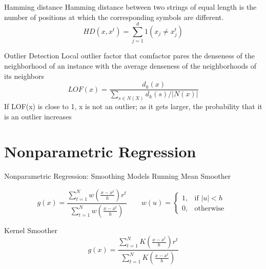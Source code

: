 \documentclass{beamer}
\begin{document}
\begin{frame}[fragile]{Hamming distance}
Hamming distance between two strings of equal length is the number of positions at which the corresponding symbols are different.
	\begin{equation}
		HD(x,x^t)=\sum_{j=1}^{d}1(x_j\neq x^{t}_{j})
	\end{equation} 
\end{frame}
\begin{frame}[fragile]{Outlier Detection}
Local outlier factor that comfactor pares the denseness of the neighborhood of an instance with the average
denseness of the neighborhoods of its neighbors 
\begin{equation}
LOF(x)=\frac{d_k(x)}{\sum_{s\in N(X)}d_k(s)/|N(x)|}
\end{equation} 
If LOF(x) is close to 1, x is not an outlier; as it gets larger, the probability that it is an outlier increases 
\end{frame}


\section{Nonparametric Regression}
\begin{frame}[fragile]{Nonparametric Regression: Smoothing Models}
Running Mean Smoother

\begin{equation}
g(x)=\frac{\sum_{t=1}^{N}w\left(\frac{x-x^t}{h}\right)r^t}{\sum_{t=1}^{N}w\left(\frac{x-x^t}{h}\right)}
 \qquad
w(u)=\begin{cases} 1, & \mbox{if } |u|<h \\ 0, & \mbox{otherwise } \end{cases}
\end{equation} 

Kernel Smoother
\begin{equation}
g(x)=\frac{\sum_{t=1}^{N}K\left(\frac{x-x^t}{h}\right)r^t}{\sum_{t=1}^{N}K\left(\frac{x-x^t}{h}\right)}
\end{equation} 
\end{frame}
\end{document}
